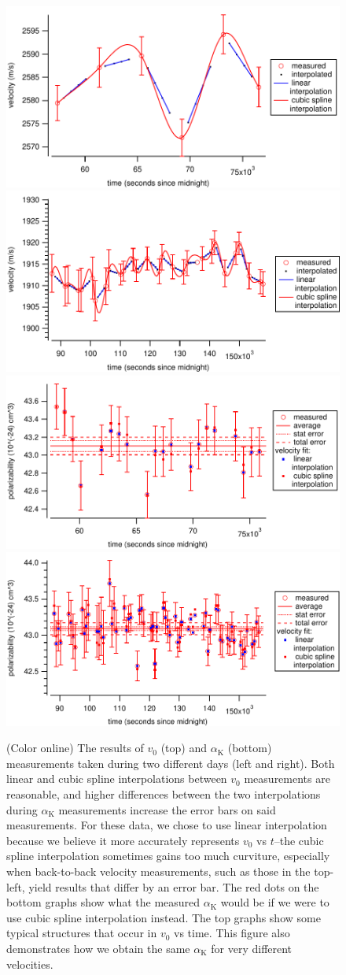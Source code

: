 \documentclass[twocolumn, prl,showpacs,superscriptaddress]{revtex4-1}   %
\newcommand{\ak}{\alpha_{\textrm{K}}}
\begin{document}
\begin{figure}
\includegraphics[width=0.49\linewidth,keepaspectratio]{velVsTime_150212.pdf}
\includegraphics[width=0.49\linewidth,keepaspectratio]{velVsTime_150413.pdf}
\includegraphics[width=0.49\linewidth,keepaspectratio]{polVsTime_150212.pdf}
\includegraphics[width=0.49\linewidth,keepaspectratio]{polVsTime_150413.pdf}
\caption{\label{velPolVsTimeExample}(Color online) The results of $v_0$ (top) and $\ak$ (bottom) measurements taken during two different days (left and right). Both linear and cubic spline interpolations between $v_0$ measurements are reasonable, and higher differences between the two interpolations during $\ak$ measurements increase the error bars on said measurements. For these data, we chose to use linear interpolation because we believe it more accurately represents $v_0$ vs $t$--the cubic spline interpolation sometimes gains too much curviture, especially when back-to-back velocity measurements, such as those in the top-left, yield results that differ by an error bar. The red dots on the bottom graphs show what the measured $\ak$ would be if we were to use cubic spline interpolation instead. The top graphs show some typical structures that occur in $v_0$ vs time. This figure also demonstrates how we obtain the same $\ak$ for very different velocities.}
\end{figure}
\end{document}
